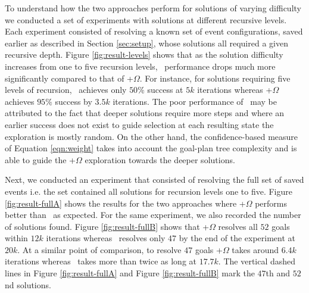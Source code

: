 \begin{figure*}[t]
\begin{center}
\subfigure[\CL]{\label{fig:result-levelsA}

}
\qquad
\subfigure[\CL+$\Omega$]{\label{fig:result-levelsB}

}
\caption{Agent performance under \CL\ and \CL+$\Omega$ schemes for solutions at recursion levels one (pluses), three (circles) and five (crosses). Each point represents results from $5$ experiment runs using an averaging window of $100$ samples.}
\label{fig:result-levels}
\end{center}
\end{figure*}

To understand how the two approaches perform for solutions of varying difficulty we conducted a set of experiments with solutions at different recursive levels. Each experiment consisted of resolving a known set of  event configurations, saved earlier as described in Section \ref{sec:setup}, whose solutions all required a given recursive depth. Figure \ref{fig:result-levels} shows that as the solution difficulty increases from one to five recursion levels, \CL\ performance drops much more significantly compared to that of \CL+$\Omega$. For instance, for solutions requiring five levels of recursion, \CL\ achieves only $50\%$ success at $5k$ iterations whereas \CL+$\Omega$ achieves $95\%$ success by $3.5k$ iterations. The poor performance of \CL\ may be attributed to the fact that deeper solutions require more  steps and where an earlier success does not exist to guide selection at each resulting state the exploration is mostly random. On the other hand, the confidence-based measure of Equation \ref{eqn:weight} takes into account the goal-plan tree complexity and is able to guide the \CL+$\Omega$ exploration towards the deeper solutions.

Next, we conducted an experiment that consisted of resolving the full set of saved  events i.e. the set contained all solutions for recursion levels one to five. Figure \ref{fig:result-fullA} shows the results for the two approaches where \CL+$\Omega$ performs better than \CL\ as expected. For the same experiment, we also recorded the number of solutions found. Figure \ref{fig:result-fullB} shows that \CL+$\Omega$ resolves all $52$ goals within $12k$ iterations whereas \CL\ resolves only $47$ by the end of the experiment at $20k$. At a similar point of comparison, to resolve $47$ goals \CL+$\Omega$ takes around $6.4k$ iterations whereas \CL\ takes more than twice as long at $17.7k$. The vertical dashed lines in Figure \ref{fig:result-fullA} and Figure \ref{fig:result-fullB} mark the $47$th and $52$nd solutions.

